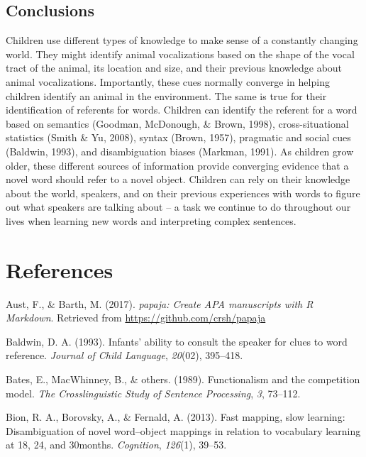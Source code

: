 \documentclass[english,floatsintext,man]{apa6}
\theoremstyle{definition}
\theoremstyle{definition}
\theoremstyle{definition}
\theoremstyle{remark}
\begin{document}
\hypertarget{conclusions}{%
\subsection{Conclusions}\label{conclusions}}

Children use different types of knowledge to make sense of a constantly
changing world. They might identify animal vocalizations based on the
shape of the vocal tract of the animal, its location and size, and their
previous knowledge about animal vocalizations. Importantly, these cues
normally converge in helping children identify an animal in the
environment. The same is true for their identification of referents for
words. Children can identify the referent for a word based on semantics
(Goodman, McDonough, \& Brown, 1998), cross-situational statistics
(Smith \& Yu, 2008), syntax (Brown, 1957), pragmatic and social cues
(Baldwin, 1993), and disambiguation biases (Markman, 1991). As children
grow older, these different sources of information provide converging
evidence that a novel word should refer to a novel object. Children can
rely on their knowledge about the world, speakers, and on their previous
experiences with words to figure out what speakers are talking about --
a task we continue to do throughout our lives when learning new words
and interpreting complex sentences.

\newpage

\hypertarget{references}{%
\section{References}\label{references}}

\setlength{\parindent}{-0.5in}
\setlength{\leftskip}{0.5in}

\hypertarget{refs}{}
\leavevmode\hypertarget{ref-R-papaja}{}%
Aust, F., \& Barth, M. (2017). \emph{papaja: Create APA manuscripts with
R Markdown}. Retrieved from \url{https://github.com/crsh/papaja}

\leavevmode\hypertarget{ref-baldwin1993infants}{}%
Baldwin, D. A. (1993). Infants' ability to consult the speaker for clues
to word reference. \emph{Journal of Child Language}, \emph{20}(02),
395--418.

\leavevmode\hypertarget{ref-bates1989functionalism}{}%
Bates, E., MacWhinney, B., \& others. (1989). Functionalism and the
competition model. \emph{The Crosslinguistic Study of Sentence
Processing}, \emph{3}, 73--112.

\leavevmode\hypertarget{ref-bion2013fast}{}%
Bion, R. A., Borovsky, A., \& Fernald, A. (2013). Fast mapping, slow
learning: Disambiguation of novel word--object mappings in relation to
vocabulary learning at 18, 24, and 30months. \emph{Cognition},
\emph{126}(1), 39--53.
\end{document}
